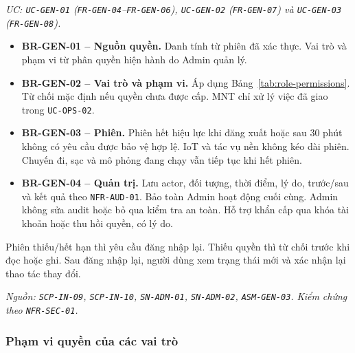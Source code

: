 \textit{UC: \texttt{UC-GEN-01} (\texttt{FR-GEN-04}--\texttt{FR-GEN-06}), \texttt{UC-GEN-02} (\texttt{FR-GEN-07}) và \texttt{UC-GEN-03} (\texttt{FR-GEN-08}).}

\medskip
\begin{itemize}
  \item \textbf{BR-GEN-01 -- Nguồn quyền.} Danh tính từ phiên đã xác thực. Vai trò và phạm vi từ phân quyền hiện hành do Admin quản lý.
  \item \textbf{BR-GEN-02 -- Vai trò và phạm vi.} Áp dụng Bảng~\ref{tab:role-permissions}. Từ chối mặc định nếu quyền chưa được cấp. MNT chỉ xử lý việc đã giao trong \texttt{UC-OPS-02}.
  \item \textbf{BR-GEN-03 -- Phiên.} Phiên hết hiệu lực khi đăng xuất hoặc sau 30 phút không có yêu cầu được bảo vệ hợp lệ. IoT và tác vụ nền không kéo dài phiên. Chuyến đi, sạc và mô phỏng đang chạy vẫn tiếp tục khi hết phiên.
  \item \textbf{BR-GEN-04 -- Quản trị.} Lưu actor, đối tượng, thời điểm, lý do, trước/sau và kết quả theo \texttt{NFR-AUD-01}. Bảo toàn Admin hoạt động cuối cùng. Admin không sửa audit hoặc bỏ qua kiểm tra an toàn. Hỗ trợ khẩn cấp qua khóa tài khoản hoặc thu hồi quyền, có lý do.
\end{itemize}

Phiên thiếu/hết hạn thì yêu cầu đăng nhập lại. Thiếu quyền thì từ chối trước khi đọc hoặc ghi. Sau đăng nhập lại, người dùng xem trạng thái mới và xác nhận lại thao tác thay đổi.

\textit{Nguồn: \texttt{SCP-IN-09}, \texttt{SCP-IN-10}, \texttt{SN-ADM-01}, \texttt{SN-ADM-02}, \texttt{ASM-GEN-03}. Kiểm chứng theo \texttt{NFR-SEC-01}.}

\subsubsection{Phạm vi quyền của các vai trò}

